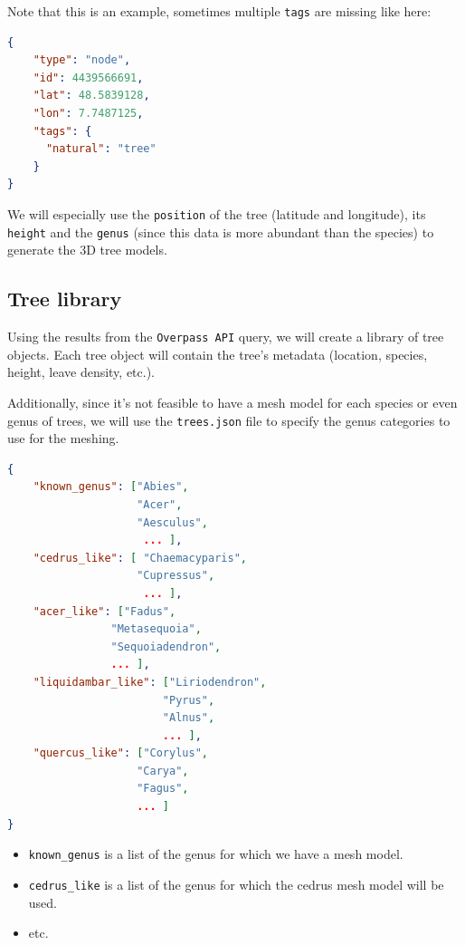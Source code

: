 \documentclass[12pt]{article}
\begin{document}
Note that this is an example, sometimes multiple \texttt{tags} are missing like here:

\begin{lstlisting}[language=json]
{
    "type": "node",
    "id": 4439566691,
    "lat": 48.5839128,
    "lon": 7.7487125,
    "tags": {
      "natural": "tree"
    }
}
\end{lstlisting}

We will especially use the \texttt{position} of the tree (latitude and longitude),
its \texttt{height} and the \texttt{genus} (since this data is more abundant than the species)
to generate the 3D tree models.

\subsection{Tree library}
Using the results from the \texttt{Overpass API} query, we will create a library
of tree objects. Each tree object will contain the tree's metadata (location, species, height,
leave density, etc.).

Additionally, since it's not feasible to have a mesh model for each species or even genus
 of trees, we will use the \texttt{trees.json} file to specify the genus
 categories to use for the meshing. \\

\newpage

\begin{lstlisting}[language=json]
{
    "known_genus": ["Abies",
                    "Acer",
                    "Aesculus",
                     ... ],
    "cedrus_like": [ "Chaemacyparis",
                    "Cupressus",
                     ... ],
    "acer_like": ["Fadus",
                "Metasequoia",
                "Sequoiadendron",
                ... ],
    "liquidambar_like": ["Liriodendron",
                        "Pyrus",
                        "Alnus",
                        ... ],
    "quercus_like": ["Corylus",
                    "Carya",
                    "Fagus",
                    ... ]
}
\end{lstlisting}

\begin{itemize}
    \item \texttt{known\_genus} is a list of the genus for which we have a mesh model.
    \item \texttt{cedrus\_like} is a list of the genus for which the cedrus mesh model will be used.
    \item etc.
\end{itemize}
\end{document}
